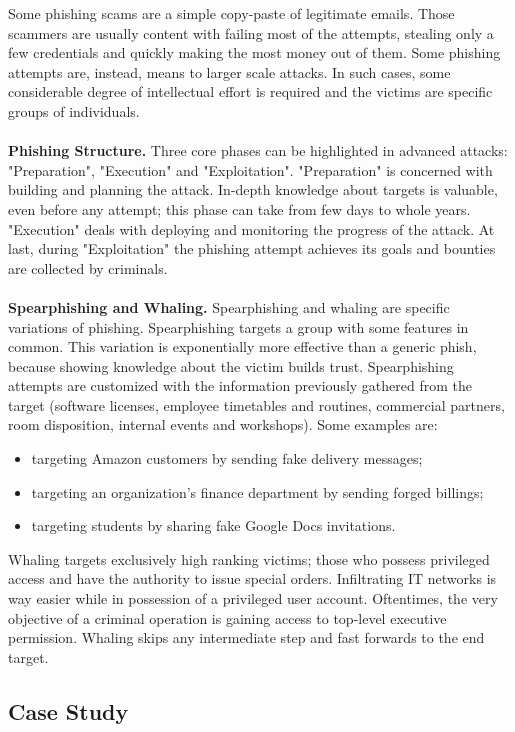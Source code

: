 \documentclass[a4paper]{article}
\begin{document}
Some phishing scams are a simple copy-paste of legitimate emails. Those scammers are usually content with failing most of the attempts, stealing only a few credentials and quickly making the most money out of them. Some phishing attempts are, instead, means to larger scale attacks. In such cases, some considerable degree of intellectual effort is required and the victims are specific groups of individuals.
\\ \\
\textbf{Phishing Structure.} Three core phases can be highlighted in advanced attacks: "Preparation", "Execution" and "Exploitation". "Preparation" is concerned with building and planning the attack. In-depth knowledge about targets is valuable, even before any attempt; this phase can take from few days to whole years. "Execution" deals with deploying and monitoring the progress of the attack. At last, during "Exploitation" the phishing attempt achieves its goals and bounties are collected by criminals.
\\ \\
\textbf{Spearphishing and Whaling.} Spearphishing and whaling are specific variations of phishing. Spearphishing targets a group with some features in common. This variation is exponentially more effective than a generic phish, because showing knowledge about the victim builds trust. Spearphishing attempts are customized with the information previously gathered from the target (software licenses, employee timetables and routines, commercial partners, room disposition, internal events and workshops). Some examples are:

\begin{itemize}
    \item targeting Amazon customers by sending fake delivery messages;
    \item targeting an organization's finance department by sending forged billings;
    \item targeting students by sharing fake Google Docs invitations.
\end{itemize}

Whaling targets exclusively high ranking victims; those who possess privileged access and have the authority to issue special orders. Infiltrating IT networks is way easier while in possession of a privileged user account. Oftentimes, the very objective of a criminal operation is gaining access to top-level executive permission. Whaling skips any intermediate step and fast forwards to the end target.

\subsection{Case Study}
\end{document}
